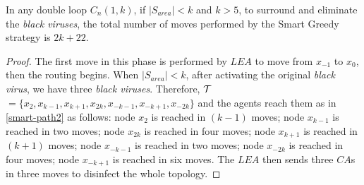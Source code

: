 %
%
%
 



\begin{theorem}
In any double loop  $C_n(1,k)$,  if $\left\vert{S_{area}}\right\vert < k$ and $k>5$, to surround and eliminate the {\it black viruses},
 the total number of moves performed by the Smart Greedy strategy is $2k+22$.
\end{theorem}
\begin{proof}
The first move in this phase is performed by $LEA$ to move from $x_{-1}$ to $x_0$, then the routing begins.
When  $\left\vert{S_{area}}\right\vert < k$, after activating the original {\it black virus}, we have three {\it black viruses}. Therefore,  ${\cal T}$$=\{x_{2},x_{k-1},x_{k+1},x_{2k},x_{-k-1},x_{-k+1},x_{-2k}\}$ and the agents reach them as in \ref {smart-path2} as follows:
node $x_{2}$ is reached in $(k-1)$ moves; node $x_{k-1}$ is reached in two moves; node $x_{2k}$ is reached in four moves; node $x_{k+1}$ is reached in $(k+1)$ moves; node $x_{-k-1}$ is reached in two moves; node $x_{-2k}$ is reached in four moves; node $x_{-k+1}$ is reached in six moves.
The $LEA$ then sends three $CA$s in three moves to disinfect the whole topology.
\end{proof}

